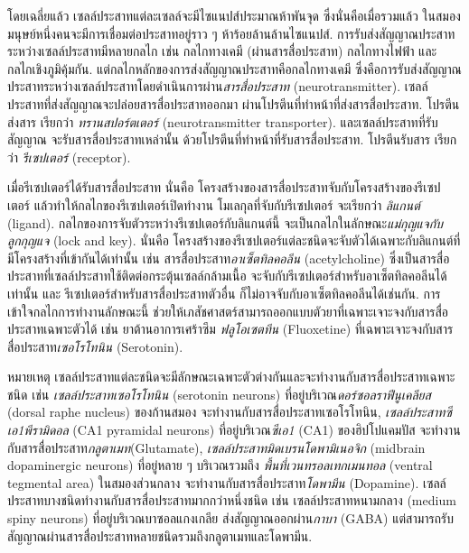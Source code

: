 {\begin{shaded}
		โดยเฉลี่ยแล้ว เซลล์ประสาทแต่ละเซลล์จะมีไซแนปส์ประมาณห้าพันจุด
		ซึ่งนั่นคือเมื่อรวมแล้ว ในสมองมนุษย์หนึ่งคนจะมีการเชื่อมต่อประสาทอยู่ราว ๆ ห้าร้อยล้านล้านไซแนปส์.
		การรับส่งสัญญาณประสาทระหว่างเซลล์ประสาทมีหลายกลไก เช่น กลไกทางเคมี (ผ่านสารสื่อประสาท) กลไกทางไฟฟ้า และ กลไกเชิงภูมิคุ้มกัน.
		แต่กลไกหลักของการส่งสัญญาณประสาทคือกลไกทางเคมี
		ซึ่งคือการรับส่งสัญญาณประสาทระหว่างเซลล์ประสาทโดยดำเนินการผ่าน\textit{สารสื่อประสาท} (neurotransmitter). 
		เซลล์ประสาทที่ส่งสัญญาณจะปล่อยสารสื่อประสาทออกมา
		ผ่านโปรตีนที่ทำหน้าที่ส่งสารสื่อประสาท.
		โปรตีนส่งสาร เรียกว่า \textit{ทรานสปอร์ตเตอร์} (neurotransmitter transporter). 
		และเซลล์ประสาทที่รับสัญญาณ จะรับสารสื่อประสาทเหล่านั้น
		ด้วยโปรตีนที่ทำหน้าที่รับสารสื่อประสาท.
		โปรตีนรับสาร เรียกว่า \textit{รีเซปเตอร์} (receptor).
		
		
		เมื่อรีเซปเตอร์ได้รับสารสื่อประสาท
		นั่นคือ โครงสร้างของสารสื่อประสาทจับกับโครงสร้างของรีเซปเตอร์
		แล้วทำให้กลไกของรีเซปเตอร์เปิดทำงาน
		โมเลกุลที่จับกับรีเซปเตอร์ จะเรียกว่า \textit{ลิแกนต์} (ligand).
		กลไกของการจับตัวระหว่างรีเซปเตอร์กับลิแกนต์นี้
		จะเป็นกลไกในลักษณะ\textit{แม่กุญแจกับลูกกุญแจ} (lock and key).
		นั่นคือ โครงสร้างของรีเซปเตอร์แต่ละชนิดจะจับตัวได้เฉพาะกับลิแกนต์ที่มีโครงสร้างที่เข้ากันได้เท่านั้น
		เช่น สารสื่อประสาท\textit{อาเซ็ตทิลคอลีน} (acetylcholine) ซึ่งเป็นสารสื่อประสาทที่เซลล์ประสาทใช้ติดต่อกระตุ้นเซลล์กล้ามเนื้อ
		จะจับกับรีเซปเตอร์สำหรับอาเซ็ตทิลคอลีนได้เท่านั้น
		และ รีเซปเตอร์สำหรับสารสื่อประสาทตัวอื่น ก็ไม่อาจจับกับอาเซ็ตทิลคอลีนได้เช่นกัน.
		การเข้าใจกลไกการทำงานลักษณะนี้ 
		ช่วยให้เภสัชศาสตร์สามารถออกแบบตัวยาที่เฉพาะเจาะจงกับสารสื่อประสาทเฉพาะตัวได้
		เช่น ยาต้านอาการเศร้าซึม \textit{ฟลูโอเซตทีน} (Fluoxetine) ที่เฉพาะเจาะจงกับสารสื่อประสาท\textit{เซอโรโทนิน} (Serotonin).
		
		หมายเหตุ เซลล์ประสาทแต่ละชนิดจะมีลักษณะเฉพาะตัวต่างกันและจะทำงานกับสารสื่อประสาทเฉพาะชนิด
		เช่น
		\textit{เซลล์ประสาทเซอโรโทนิน} (serotonin neurons) ที่อยู่บริเวณ\textit{ดอร์ซอลราฟีนูเคลียส} (dorsal raphe nucleus) ของก้านสมอง จะทำงานกับสารสื่อประสาทเซอโรโทนิน\cite{LiEtAl2016a},
		\textit{เซลล์ประสาทซีเอ1พีรามิดอล} (CA1 pyramidal neurons) ที่อยู่บริเวณ\textit{ซีเอ1} (CA1) ของฮิปโปแคมปัส
		จะทำงานกับสารสื่อประสาท\textit{กลูตาเมท}(Glutamate)\cite{NeuroBank},
		\textit{เซลล์ประสาทมิดเบรนโดพามิเนอจิก} (midbrain dopaminergic neurons) ที่อยู่หลาย ๆ  บริเวณรวมถึง \textit{พื้นที่เวนทรอลเทกเมนทอล} (ventral tegmental area) ในสมองส่วนกลาง
		จะทำงานกับสารสื่อประสาท\textit{โดพามีน} (Dopamine)\cite{NeuroBank}.
		เซลล์ประสาทบางชนิดทำงานกับสารสื่อประสาทมากกว่าหนึ่งชนิด เช่น
		เซลล์ประสาทหนามกลาง (medium spiny neurons) ที่อยู่บริเวณบาซอลแกงเกลีย
		ส่งสัญญาณออกผ่าน\textit{กาบา} (GABA) แต่สามารถรับสัญญาณผ่านสารสื่อประสาทหลายชนิดรวมถึงกลูตาเมทและโดพามีน.
		
	\end{shaded}
}


